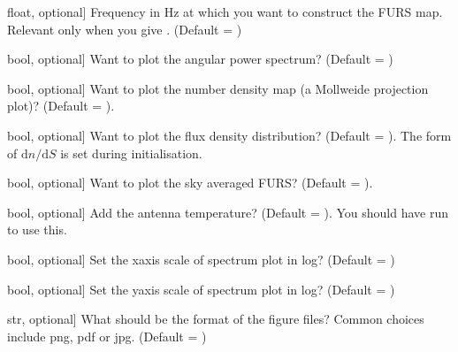 \documentclass[letterpaper,10pt,english]{sphinxmanual}
\begin{document}
\begin{fulllineitems}
\begin{fulllineitems}
\begin{description}
\sphinxlineitem{nu\_skymap}{[}float, optional{]}
\sphinxAtStartPar
Frequency in Hz at which you want to construct the FURS map. Relevant only when you give .
(Default = )

\sphinxlineitem{aps}{[}bool, optional{]}
\sphinxAtStartPar
Want to plot the angular power spectrum? (Default = )

\sphinxlineitem{n\_skymap}{[}bool, optional{]}
\sphinxAtStartPar
Want to plot the number density map (a Mollweide projection plot)? (Default = ).

\sphinxlineitem{dndS}{[}bool, optional{]}
\sphinxAtStartPar
Want to plot the flux density distribution? (Default = ). The form of \(\mathrm{d}n/\mathrm{d}S\) is set during initialisation.

\sphinxlineitem{spectrum}{[}bool, optional{]}
\sphinxAtStartPar
Want to plot the sky averaged FURS? (Default = ).

\sphinxlineitem{antenna}{[}bool, optional{]}
\sphinxAtStartPar
Add the antenna temperature? (Default = ). You should have run {\hyperref[\detokenize{api:furs.furs.couple2D}]{}} to use this.

\sphinxlineitem{xlog}{[}bool, optional{]}
\sphinxAtStartPar
Set the x\sphinxhyphen{}axis scale of spectrum plot in log? (Default = )

\sphinxlineitem{ylog}{[}bool, optional{]}
\sphinxAtStartPar
Set the y\sphinxhyphen{}axis scale of spectrum plot in log? (Default = )

\sphinxlineitem{fig\_ext}{[}str, optional{]}
\sphinxAtStartPar
What should be the format of the figure files? Common choices include png, pdf or jpg. (Default = )

\end{description}

\end{fulllineitems}


\end{fulllineitems}



\renewcommand{\indexname}{Python Module Index}
\begin{sphinxtheindex}
\let\bigletter\sphinxstyleindexlettergroup
\bigletter{f}
\item\relax{}
\end{sphinxtheindex}

\renewcommand{\indexname}{Index}
\printindex
\end{document}
